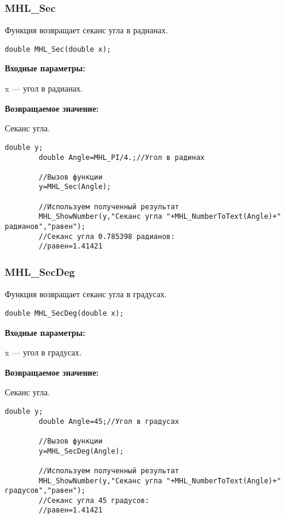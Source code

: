 \documentclass[a4paper,12pt]{article}
\begin{document}
\subsubsection{MHL\_Sec}\label{MHL_Sec}

Функция возвращает секанс угла в радианах.


\begin{lstlisting}[label=code_syntax_MHL_Sec,caption=Синтаксис]
double MHL_Sec(double x);
\end{lstlisting}

\textbf{Входные параметры:}

 x --- угол в радианах.

\textbf{Возвращаемое значение:}

Секанс угла.


\begin{lstlisting}[label=code_use_MHL_Sec,caption=Пример использования]
        double y;
        double Angle=MHL_PI/4.;//Угол в радинах

        //Вызов функции
        y=MHL_Sec(Angle);

        //Используем полученный результат
        MHL_ShowNumber(y,"Секанс угла "+MHL_NumberToText(Angle)+" радианов","равен");
        //Секанс угла 0.785398 радианов:
        //равен=1.41421
\end{lstlisting}

\subsubsection{MHL\_SecDeg}\label{MHL_SecDeg}

Функция возвращает секанс угла в градусах.


\begin{lstlisting}[label=code_syntax_MHL_SecDeg,caption=Синтаксис]
double MHL_SecDeg(double x);
\end{lstlisting}

\textbf{Входные параметры:}

 x --- угол в градусах.

\textbf{Возвращаемое значение:}

Секанс угла.


\begin{lstlisting}[label=code_use_MHL_SecDeg,caption=Пример использования]
        double y;
        double Angle=45;//Угол в градусах

        //Вызов функции
        y=MHL_SecDeg(Angle);

        //Используем полученный результат
        MHL_ShowNumber(y,"Секанс угла "+MHL_NumberToText(Angle)+" градусов","равен");
        //Секанс угла 45 градусов:
        //равен=1.41421
\end{lstlisting}
\end{document}
